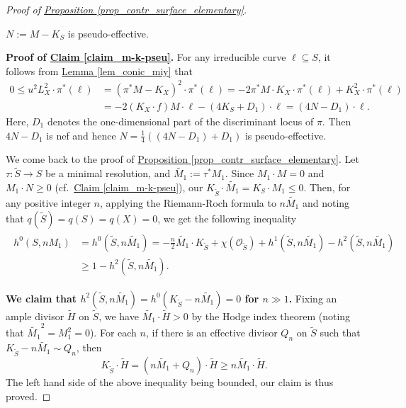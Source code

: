\begin{proof}[Proof of {\hyperref[prop_contr_surface_elementary]{Proposition   \ref*{prop_contr_surface_elementary}}}]
\begin{claim}\label{claim_m-k-pseu}
$N:=M-K_S$	is pseudo-effective.
\end{claim}

\noindent
\textbf{Proof of  {\hyperref[claim_m-k-pseu]{Claim \ref*{claim_m-k-pseu}}}.}
For any irreducible curve $\ell\subseteq S$, it follows from {\hyperref[lem_conic_miy]{Lemma    \ref*{lem_conic_miy}}} that
\begin{align*}
 0\leqslant  u^2L_X^2\cdot\pi^*(\ell)&=(\pi^*M-K_X)^2\cdot\pi^*(\ell)=-2\pi^*M\cdot K_X\cdot \pi^*(\ell)	+K_X^2\cdot\pi^*(\ell)\\
 &=-2(K_X\cdot f)M\cdot \ell-(4K_S+D_1)\cdot \ell=(4N-D_1)\cdot \ell.
\end{align*}
Here,  $D_1$ denotes the one-dimensional part of the discriminant locus of  $\pi$.  
Then $4N-D_1$ is nef and hence
$N=\frac{1}{4}((4N-D_1)+D_1)$ is pseudo-effective.


\par \vskip 1pc \noindent

We come back to the proof of {\hyperref[prop_contr_surface_elementary]{Proposition   \ref*{prop_contr_surface_elementary}}}. 
Let $\tau:\widetilde{S}\to S$ be a minimal resolution, and  $\widetilde{M_1}:=\tau^*M_1$. %
Since  $M_1\cdot M=0$ and $M_1\cdot N\geqslant 0$ (cf.~{\hyperref[claim_m-k-pseu]{Claim \ref*{claim_m-k-pseu}}}), our $K_{\widetilde{S}}\cdot \widetilde{M_1}=K_S\cdot M_1\leqslant 0$. 
Then, for any positive integer $n$, applying the Riemann-Roch formula to $n\widetilde{M_1}$ and noting that $q(\widetilde{S})=q(S)=q(X)=0$, we get the following inequality
\begin{align}\label{eq_RR}
\begin{split}
h^0(S,nM_1)&=h^0(\widetilde{S},n\widetilde{M_1})=-\frac{n}{2}\widetilde{M_1}\cdot K_{\widetilde{S}}+\chi(\mathcal{O}_{\widetilde{S}})+h^1(\widetilde{S},n\widetilde{M_1})-h^2(\widetilde{S},n\widetilde{M_1})\\
&\geqslant 1-h^2(\widetilde{S},n\widetilde{M_1}).
\end{split}
\end{align}

\textbf{We claim that $h^2(\widetilde{S},n\widetilde{M_1})=h^0(K_{\widetilde{S}}-n\widetilde{M_1})=0$ for $n\gg 1$.}  
Fixing an ample divisor $\widetilde{H}$ on $\widetilde{S}$, we have $\widetilde{M_1}\cdot \widetilde{H}>0$ by the Hodge index theorem (noting that $\widetilde{M_1}^2=M_1^2=0$).
For each $n$, if there is an effective divisor $Q_n$  on $\widetilde{S}$ such that $K_{\widetilde{S}}-n\widetilde{M_1}\sim Q_n$, then 
$$K_{\widetilde{S}}\cdot \widetilde{H}=(n\widetilde{M_1}+Q_n)\cdot\widetilde{H}\geqslant  n\widetilde{M_1}\cdot\widetilde{H}.$$
The left hand side of the above inequality being bounded, our claim is thus proved.


\end{proof}
